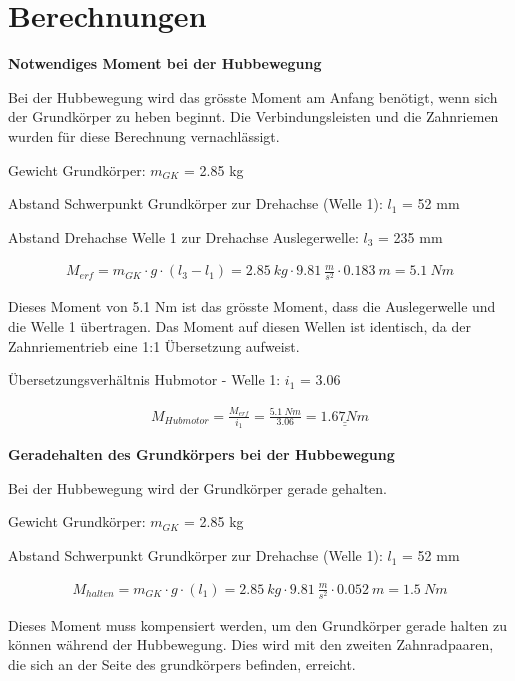 \newpage

\section{Berechnungen}

\textbf{Notwendiges Moment bei der Hubbewegung}

Bei der Hubbewegung wird das grösste Moment am Anfang benötigt, wenn sich der Grundkörper zu heben beginnt. Die Verbindungsleisten und die Zahnriemen wurden für diese Berechnung vernachlässigt.

Gewicht Grundkörper: $m_{GK}$ = 2.85 kg

Abstand Schwerpunkt Grundkörper zur Drehachse (Welle 1): $l_{1}$ = 52 mm

Abstand Drehachse Welle 1 zur Drehachse Auslegerwelle: $l_{3}$ = 235 mm

\begin{align*}
M_{erf} = m_{GK} \cdot g \cdot (l_{3}-l_{1}) = 2.85\ kg \cdot 9.81\ \frac{m}{s^2} \cdot 0.183\ m = 5.1\ Nm
\end{align*}

Dieses Moment von 5.1 Nm ist das grösste Moment, dass die Auslegerwelle und die Welle 1 übertragen. Das Moment auf diesen Wellen ist identisch, da der Zahnriementrieb eine 1:1 Übersetzung aufweist.

Übersetzungsverhältnis Hubmotor - Welle 1: $i_{1}$ = 3.06

\begin{align*}
M_{Hubmotor} = \frac{M_{erf}}{i_{1}} = \frac{5.1\ Nm}{3.06} = \underline{\underline{1.67 Nm}}
\end{align*}



\textbf{Geradehalten des Grundkörpers bei der Hubbewegung}

Bei der Hubbewegung wird der Grundkörper gerade gehalten.

Gewicht Grundkörper: $m_{GK}$ = 2.85 kg

Abstand Schwerpunkt Grundkörper zur Drehachse (Welle 1): $l_{1}$ = 52 mm

\begin{align*}
M_{halten} = m_{GK} \cdot g \cdot (l_{1}) = 2.85\ kg \cdot 9.81\ \frac{m}{s^2} \cdot 0.052\ m = 1.5\ Nm
\end{align*}

Dieses Moment muss kompensiert werden, um den Grundkörper gerade halten zu können während der Hubbewegung. Dies wird mit den zweiten Zahnradpaaren, die sich an der Seite des grundkörpers befinden, erreicht.

